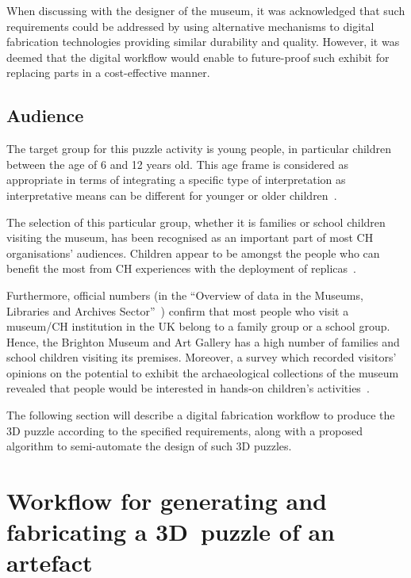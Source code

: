 \documentclass[acmlarge,screen,dvipsnames]{acmart}
\begin{document}
When discussing with the designer of the museum, it was acknowledged
that such requirements could be addressed by using alternative
mechanisms to digital fabrication technologies providing similar
durability and quality. However, it was deemed that the digital
workflow would enable to future-proof such exhibit for replacing parts
in a cost-effective manner.

\subsection{Audience}

The target group for this puzzle activity is young people, in
particular children between the age of 6 and 12 years old. This age
frame is considered as appropriate in terms of integrating a specific
type of interpretation as interpretative means can be different for
younger or older children~\cite{Tilden1977}.

The selection of this particular group, whether it is families or
school children visiting the museum, has been recognised as an
important part of most CH organisations' audiences. Children appear to
be amongst the people who can benefit the most from CH experiences
with the deployment of replicas~\cite{Cabral2013,Neely2015,Miles2015}.

Furthermore, official numbers (in the ``Overview of data in the
Museums, Libraries and Archives Sector''~\cite{Matty2004}) confirm
that most people who visit a museum/CH institution in the UK belong to
a family group or a school group. Hence, the Brighton Museum and Art
Gallery has a high number of families and school children visiting its
premises. Moreover, a survey which recorded visitors' opinions on the
potential to exhibit the archaeological collections of the museum
revealed that people would be interested in hands-on children's
activities~\cite{RoyalPavilionandMuseums2015}.

The following section will describe a digital fabrication workflow to
produce the 3D puzzle according to the specified requirements, along
with a proposed algorithm to semi-automate the design of such 3D
puzzles.

\section{Workflow for generating and fabricating a
  3D~puzzle of an artefact}
\label{workflow}
\end{document}
